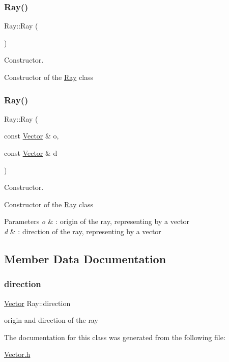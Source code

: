 \subsubsection{\texorpdfstring{Ray()}{Ray()}\hspace{0.1cm}{\footnotesize\ttfamily [1/2]}}
{\footnotesize\ttfamily Ray\+::\+Ray (\begin{DoxyParamCaption}{ }\end{DoxyParamCaption})\hspace{0.3cm}{\ttfamily [inline]}}



Constructor. 

Constructor of the \hyperlink{classRay}{Ray} class \mbox{\label{classRay_a91e6be9287d2fec117feca20ef4d05bb}} 
\subsubsection{\texorpdfstring{Ray()}{Ray()}\hspace{0.1cm}{\footnotesize\ttfamily [2/2]}}
{\footnotesize\ttfamily Ray\+::\+Ray (\begin{DoxyParamCaption}\item[{const \hyperlink{classVector}{Vector} \&}]{o,  }\item[{const \hyperlink{classVector}{Vector} \&}]{d }\end{DoxyParamCaption})\hspace{0.3cm}{\ttfamily [inline]}}



Constructor. 

Constructor of the \hyperlink{classRay}{Ray} class


\begin{DoxyParams}{Parameters}
{\em o} & \+: origin of the ray, representing by a vector \\
\hline
{\em d} & \+: direction of the ray, representing by a vector \\
\hline
\end{DoxyParams}


\subsection{Member Data Documentation}
\mbox{\label{classRay_a16aab6305abe72d63f7d4dab554db7c1}} 
\subsubsection{\texorpdfstring{direction}{direction}}
{\footnotesize\ttfamily \hyperlink{classVector}{Vector} Ray\+::direction}

origin and direction of the ray 

The documentation for this class was generated from the following file\+:\begin{DoxyCompactItemize}
\item 
\hyperlink{Vector_8h}{Vector.\+h}\end{DoxyCompactItemize}
